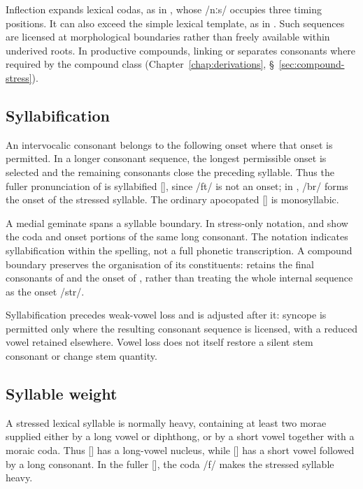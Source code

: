 Inflection expands lexical codas, as in , whose /nːs/ occupies three timing positions. It can also exceed the simple lexical template, as in . Such sequences are licensed at morphological boundaries rather than freely available within underived roots. In productive compounds, linking  or  separates consonants where required by the compound class (Chapter~\ref{chap:derivations}, \S~\ref{sec:compound-stress}).

\subsection{Syllabification}

An intervocalic consonant belongs to the following onset where that onset is permitted. In a longer consonant sequence, the longest permissible onset is selected and the remaining consonants close the preceding syllable. Thus the fuller pronunciation of  is syllabified [], since /ft/ is not an onset; in , /br/ forms the onset of the stressed syllable. The ordinary apocopated  [] is monosyllabic.

A medial geminate spans a syllable boundary. In stress-only notation,  and  show the coda and onset portions of the same long consonant. The notation indicates syllabification within the spelling, not a full phonetic transcription. A compound boundary preserves the organisation of its constituents:  retains the final consonants of  and the onset of , rather than treating the whole internal sequence as the onset /str/.

Syllabification precedes weak-vowel loss and is adjusted after it: syncope is permitted only where the resulting consonant sequence is licensed, with a reduced vowel retained elsewhere. Vowel loss does not itself restore a silent stem consonant or change stem quantity.

\subsection{Syllable weight}

A stressed lexical syllable is normally heavy, containing at least two morae supplied either by a long vowel or diphthong, or by a short vowel together with a moraic coda. Thus  [] has a long-vowel nucleus, while  [] has a short vowel followed by a long consonant. In the fuller [], the coda /f/ makes the stressed syllable heavy.

